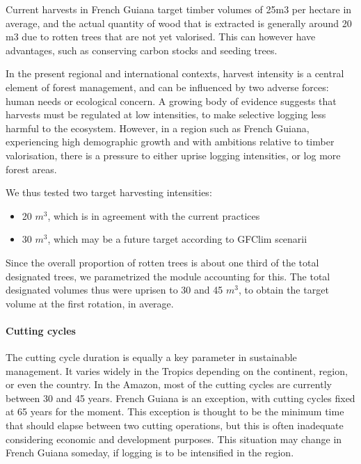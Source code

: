 \documentclass[12pt,]{article}
\providecommand{\tightlist}{%
\setlength{\itemsep}{0pt}\setlength{\parskip}{0pt}}
\theoremstyle{definition}
\theoremstyle{definition}
\theoremstyle{definition}
\theoremstyle{remark}
\begin{document}
Current harvests in French Guiana target timber volumes of 25m3 per
hectare in average, and the actual quantity of wood that is extracted is
generally around 20 m3 due to rotten trees that are not yet valorised.
This can however have advantages, such as conserving carbon stocks and
seeding trees.

In the present regional and international contexts, harvest intensity is
a central element of forest management, and can be influenced by two
adverse forces: human needs or ecological concern. A growing body of
evidence suggests that harvests must be regulated at low intensities, to
make selective logging less harmful to the ecosystem. However, in a
region such as French Guiana, experiencing high demographic growth and
with ambitions relative to timber valorisation, there is a pressure to
either uprise logging intensities, or log more forest areas.

We thus tested two target harvesting intensities:

\begin{itemize}
\tightlist
\item
  20 \(m^3\), which is in agreement with the current practices
\item
  30 \(m^3\), which may be a future target according to GFClim scenarii
\end{itemize}

Since the overall proportion of rotten trees is about one third of the
total designated trees, we parametrized the module accounting for this.
The total designated volumes thus were uprisen to 30 and 45 \(m^3\), to
obtain the target volume at the first rotation, in average.

\paragraph{Cutting cycles}\label{cutting-cycles}

The cutting cycle duration is equally a key parameter in sustainable
management. It varies widely in the Tropics depending on the continent,
region, or even the country. In the Amazon, most of the cutting cycles
are currently between 30 and 45 years. French Guiana is an exception,
with cutting cycles fixed at 65 years for the moment. This exception is
thought to be the minimum time that should elapse between two cutting
operations, but this is often inadequate considering economic and
development purposes. This situation may change in French Guiana
someday, if logging is to be intensified in the region.
\end{document}
